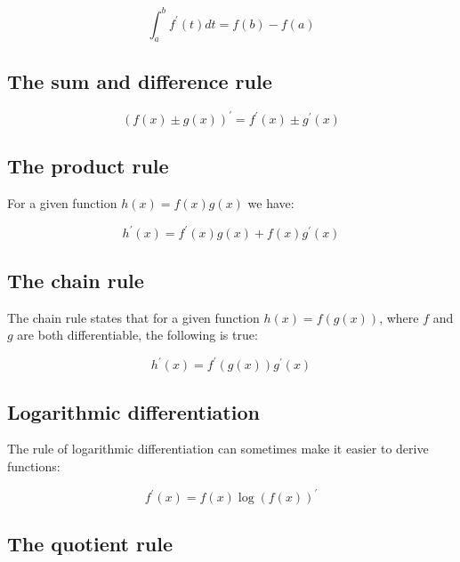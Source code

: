 \documentclass{report}
\begin{document}
\begin{equation}\label{eq:fundamental-theorem-of-calculus}
    \int_a^b f^\prime(t) dt = f(b) - f(a)
\end{equation}

\subsection{The sum and difference rule}

\begin{equation}\label{eq:sum-and-difference-rule}
    (f(x) \pm g(x))^\prime = f^\prime(x) \pm g^\prime(x)
\end{equation}

\subsection{The product rule}

For a given function $h(x) = f(x)g(x)$ we have:

\begin{equation}\label{eq:product-rule}
    h^\prime(x) = f^\prime(x)g(x) + f(x)g^\prime(x)
\end{equation}

\subsection{The chain rule}

The chain rule states that for a given function $h(x) = f(g(x))$, where $f$ and $g$ are both differentiable, the following is true:

\begin{equation}\label{eq:chain-rule}
    h^\prime(x) = f^\prime(g(x))g^\prime(x)
\end{equation}

\subsection{Logarithmic differentiation}

The rule of logarithmic differentiation can sometimes make it easier to derive functions:

\begin{equation}\label{eq:logarithmic-differentiation}
    f^\prime(x) = f(x) \log(f(x))^\prime
\end{equation}

\subsection{The quotient rule}
\end{document}
